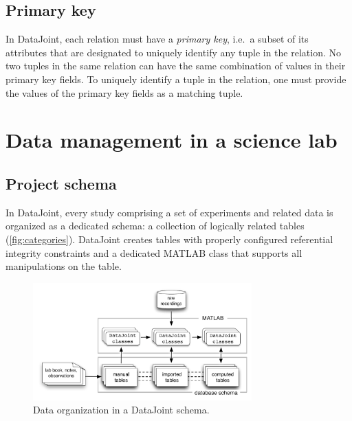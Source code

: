 \documentclass[10pt]{article}
\begin{document}
\subsection{Primary key}
In DataJoint, each relation must have a {\em primary key}, i.e.~a subset of its attributes that are designated to uniquely identify any tuple in the relation. No two tuples in the same relation can have the same combination of values in their primary key fields.  To uniquely identify a tuple in the relation, one must provide the values of the primary key fields as a matching tuple. 

\section{Data management in a science lab}
\subsection{Project schema}
In DataJoint, every study comprising a set of experiments and related data is organized as a dedicated schema: a collection of logically related tables (\autoref{fig:categories}).  DataJoint creates tables with properly configured referential integrity constraints and a dedicated MATLAB class that supports all manipulations on the table.

\begin{figure}[htb]
\center
\includegraphics[width=0.75\textwidth]{categories.pdf}
\caption{Data organization in a DataJoint schema.}
\label{fig:categories}
\end{figure} 
 
\end{document}
